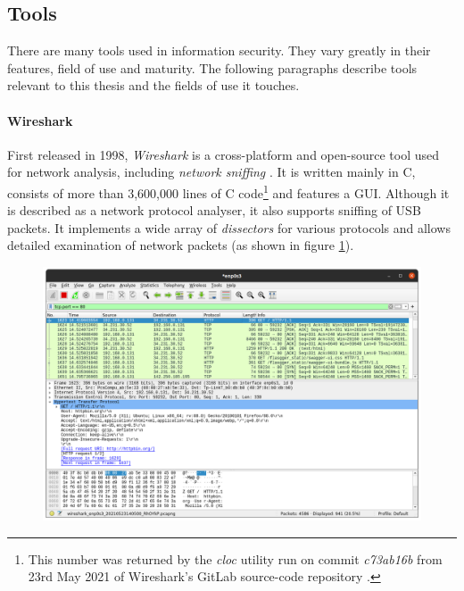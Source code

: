 \subsection{Tools}
There are many tools used in information security. They vary greatly in their features, field of use and maturity. The following paragraphs describe tools relevant to this thesis and the fields of use it touches.

\paragraph{Wireshark} First released in 1998, \emph{Wireshark} is a cross-platform and open-source tool used for network analysis, including \emph{network sniffing} \cite{wireshark}. It is written mainly in C, consists of more than 3,600,000 lines of C code\footnote{This number was returned by the \emph{cloc} utility run on commit \emph{c73ab16b} from 23rd May 2021 of Wireshark's GitLab source-code repository \cite{wiresharkgit}.} and features a \ac{GUI}. Although it is described as a network protocol analyser, it also supports sniffing of \ac{USB} packets. It implements a wide array of \emph{dissectors} for various protocols and allows detailed examination of network packets (as shown in figure \ref{fig:wireshark}).

\begin{figure}[h]
    \centering
    \includegraphics[width=14cm]{img/ch03/wireshark.png}
    \label{fig:wireshark}
\end{figure}

